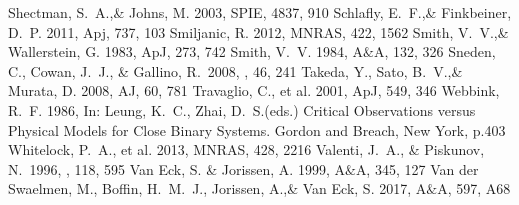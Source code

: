\documentclass[a4paper,fleqn,usenatbib]{mnras}
\begin{document}
\begin{thebibliography}{99}
Shectman, S.~A.,\& Johns, M. 2003, 
SPIE, 4837, 910
Schlafly, E.~F.,\& Finkbeiner, D.~P. 2011, 
Apj, 737, 103
Smiljanic, R. 2012, 
MNRAS, 422, 1562
Smith, V.~V.,\& Wallerstein, G. 1983, 
ApJ, 273, 742
Smith, V.~V. 1984, 
A$\&$A, 132, 326
 Sneden, C., Cowan, J.~J., \& Gallino, R.\ 2008, \araa, 46, 241 
Takeda, Y., Sato, B.~V.,\& Murata, D. 2008, 
AJ, 60, 781
Travaglio, C., et al. 2001, 
ApJ, 549, 346
Webbink, R.~F. 1986, 
In: Leung, K.~C., Zhai, D.~S.(eds.) Critical Observations versus Physical Models for Close Binary Systems. Gordon and Breach, New York, p.403
Whitelock, P.~A., et al. 2013, 
MNRAS, 428, 2216
 Valenti, J.~A., \& Piskunov, N.\ 1996, \aaps, 118, 595 
Van Eck, S. \& Jorissen, A. 1999, 
A$\&$A, 345, 127
Van der Swaelmen, M., Boffin, H.~M.~J., Jorissen, A.,\& Van Eck, S. 2017, 
A$\&$A, 597, A68
\end{thebibliography}
\bsp	%
\label{lastpage}
\end{document}

